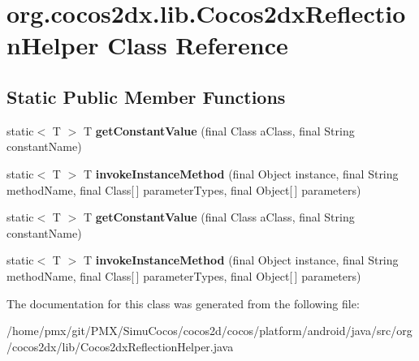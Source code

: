 \hypertarget{classorg_1_1cocos2dx_1_1lib_1_1Cocos2dxReflectionHelper}{}\section{org.\+cocos2dx.\+lib.\+Cocos2dx\+Reflection\+Helper Class Reference}
\label{classorg_1_1cocos2dx_1_1lib_1_1Cocos2dxReflectionHelper}
\subsection*{Static Public Member Functions}
\begin{DoxyCompactItemize}
\item 
\mbox{\label{classorg_1_1cocos2dx_1_1lib_1_1Cocos2dxReflectionHelper_a017db1a56f31eeef4a8dafb67d52bf5a}} 
static$<$ T $>$ T {\bfseries get\+Constant\+Value} (final Class a\+Class, final String constant\+Name)
\item 
\mbox{\label{classorg_1_1cocos2dx_1_1lib_1_1Cocos2dxReflectionHelper_ab2654821b43702e9f87c4c95c70aad49}} 
static$<$ T $>$ T {\bfseries invoke\+Instance\+Method} (final Object instance, final String method\+Name, final Class\mbox{[}$\,$\mbox{]} parameter\+Types, final Object\mbox{[}$\,$\mbox{]} parameters)
\item 
\mbox{\label{classorg_1_1cocos2dx_1_1lib_1_1Cocos2dxReflectionHelper_a017db1a56f31eeef4a8dafb67d52bf5a}} 
static$<$ T $>$ T {\bfseries get\+Constant\+Value} (final Class a\+Class, final String constant\+Name)
\item 
\mbox{\label{classorg_1_1cocos2dx_1_1lib_1_1Cocos2dxReflectionHelper_ab2654821b43702e9f87c4c95c70aad49}} 
static$<$ T $>$ T {\bfseries invoke\+Instance\+Method} (final Object instance, final String method\+Name, final Class\mbox{[}$\,$\mbox{]} parameter\+Types, final Object\mbox{[}$\,$\mbox{]} parameters)
\end{DoxyCompactItemize}


The documentation for this class was generated from the following file\+:\begin{DoxyCompactItemize}
\item 
/home/pmx/git/\+P\+M\+X/\+Simu\+Cocos/cocos2d/cocos/platform/android/java/src/org/cocos2dx/lib/Cocos2dx\+Reflection\+Helper.\+java\end{DoxyCompactItemize}

